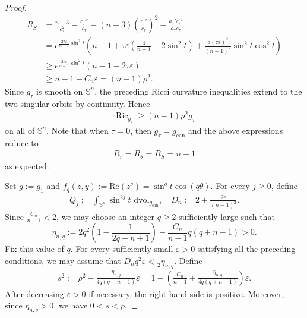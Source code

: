 \documentclass[11pt,reqno]{amsart}
\numberwithin{equation}{section}
\theoremstyle{definition}
\theoremstyle{remark}
\newcommand{\eee}{\mathrm e}
\newcommand{\ta}{\tau}
\renewcommand\Re{\mathrm{Re}\,}
\renewcommand{\Re}{\mathrm{Re}}
\newcommand{\0}{\emptyset}
\newcommand{\veps}{\varepsilon}
\newcommand{\bbS}{\mathbb S}
\newcommand{\Ric}{\operatorname{Ric}}
\newcommand{\can}{\mathrm{can}}
\newcommand{\dvol}{\,\mathrm{dvol}}
\begin{document}
\begin{proof}
\begin{align}
        R_S
        &=
        \frac{n-3}{c_\ta^2}
        -
        \frac{c_\ta''}{c_\ta}
        -
        (n-3)
        \left(
        \frac{c_\ta'}{c_\ta}
        \right)^2
        -
        \frac{a_\ta'c_\ta'}{a_\ta c_\ta}\\
        &=
        e^{\frac{2\ta\veps}{n-1}\sin^2t}
        \left(
        n-1
        +
        \ta\veps
        \left(
        \frac4{n-1}-2\sin^2t
        \right)
        +
        \frac{8(\ta\veps)^2}{(n-1)^2}
        \sin^2t\cos^2t
        \right)\\
        &\geq
        e^{\frac{2\ta\veps}{n-1}\sin^2t}
        \left(
        n-1-2\ta\veps
        \right)\\
        &\geq
        n-1-C_n\veps= (n-1)\rho^2.
        \label{eq:gaussian-split-link-RS}
\end{align}
Since $g_\ta$ is smooth on $\bbS^n$, the preceding Ricci curvature
inequalities extend to the two singular orbits by continuity. Hence
\begin{align}
        \Ric_{g_\ta}
        \geq
        (n-1)\rho^2g_\ta
\end{align}
on all of $\bbS^n$. Note that when $\ta=0$, then $g_\ta=g_\can$ and the above expressions reduce to
\begin{align}
        R_r=R_\theta=R_S=n-1
\end{align}
as expected. 

Set $\bar g:=g_1$ and
$f_q(z,y):=\Re(z^q)=\sin^qt\cos(q\theta)$. For every $j\geq0$, define
\begin{align}
 Q_j:=\int_{\bbS^n}\sin^{2j}t\,\dvol_{g_\can},\quad D_n:=2+\frac{2\eee}{(n-1)^2}.
\end{align}
Since $\frac{C_n}{n-1}<2$, we may choose an integer $q\geq2$ sufficiently large such that
\[
        \eta_{n,q}
        :=
        2q^2
        \left(
        1-\frac1{2q+n+1}
        \right)
        -
        \frac{C_n}{n-1}q(q+n-1)
        >
        0.
\]
Fix this value of $q$. For every sufficiently small $\veps>0$ satisfying all
the preceding conditions, we may assume that
$D_nq^2\veps<\frac12\eta_{n,q}$. Define
\begin{align}\label{eq:gaussian-split-s-definition}
        s^2
        :=
        \rho^2
        -
        \frac{\eta_{n,q}}{4q(q+n-1)}\veps=
        1-
        \left(
        \frac{C_n}{n-1}
        +
        \frac{\eta_{n,q}}{4q(q+n-1)}
        \right)\veps.
\end{align}
After decreasing $\veps>0$ if necessary, the right-hand side is positive.
Moreover, since $\eta_{n,q}>0$, we have $0<s<\rho$.


\end{proof}
\end{document}

